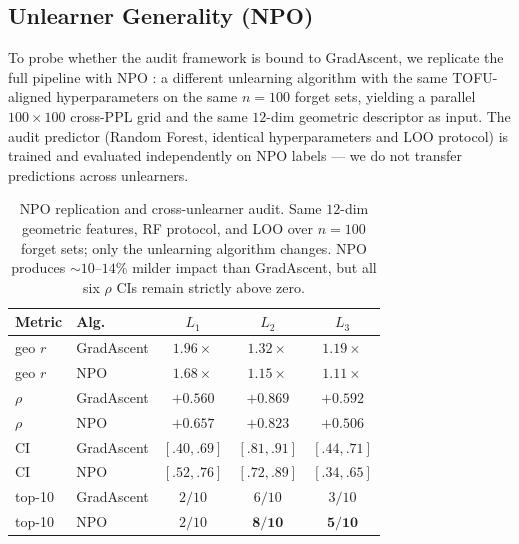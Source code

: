 \documentclass[11pt]{article}
\newcommand{\Lone}{L_1}
\newcommand{\Ltwo}{L_2}
\newcommand{\Lthree}{L_3}
\begin{document}
\subsection{Unlearner Generality (NPO)}
\label{sec:cross-unlearner}

To probe whether the audit framework is bound to GradAscent, we replicate the
full pipeline with NPO \citep{zhang2024negative}: a different unlearning
algorithm with the same TOFU-aligned hyperparameters on the same $n{=}100$
forget sets, yielding a parallel $100\times100$ cross-PPL grid and the same
$12$-dim geometric descriptor as input. The audit predictor (Random Forest,
identical hyperparameters and LOO protocol) is trained and evaluated
independently on NPO labels — we do not transfer predictions across unlearners.

\begin{table}[t]
\centering
\footnotesize
\setlength{\tabcolsep}{2.1pt}
\begin{tabular}{@{}llccc@{}}
    \toprule
    Metric & Alg. & $\Lone$ & $\Ltwo$ & $\Lthree$ \\
    \midrule
    geo $r$
       & GradAscent & $1.96\times$       & $1.32\times$       & $1.19\times$       \\
    geo $r$
       & NPO        & $1.68\times$       & $1.15\times$       & $1.11\times$       \\
    \midrule
    $\rho$
       & GradAscent & $+0.560$           & $\mathbf{+0.869}$  & $+0.592$           \\
    $\rho$
       & NPO        & $\mathbf{+0.657}$  & $+0.823$           & $+0.506$           \\
    \midrule
    CI
       & GradAscent & $[.40,.69]$        & $[.81,.91]$        & $[.44,.71]$        \\
    CI
       & NPO        & $[.52,.76]$        & $[.72,.89]$        & $[.34,.65]$        \\
    \midrule
    top-10
       & GradAscent & $2/10$             & $6/10$             & $3/10$             \\
    top-10
       & NPO        & $2/10$             & $\mathbf{8/10}$    & $\mathbf{5/10}$    \\
    \bottomrule
\end{tabular}
\caption{NPO replication and cross-unlearner audit. Same $12$-dim geometric features, RF protocol, and LOO over $n{=}100$ forget sets; only the unlearning algorithm changes. NPO produces ${\sim}10\text{--}14\%$ milder impact than GradAscent, but all six $\rho$ CIs remain strictly above zero.}
\label{tab:cross-unlearner}
\end{table}
\end{document}
